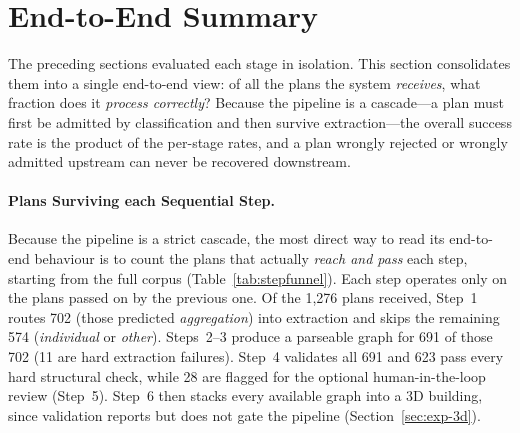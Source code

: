 \documentclass[12pt,a4paper,openright]{report}
\begin{document}
\section{End-to-End Summary}
\label{sec:exp-summary}

The preceding sections evaluated each stage in isolation. This section
consolidates them into a single end-to-end view: of all the plans the system \emph{receives}, what fraction does it \emph{process correctly}? Because the pipeline is a cascade---a plan must first be admitted by classification and then survive extraction---the overall success rate is the product of the per-stage rates, and a plan wrongly rejected or wrongly admitted upstream can never be recovered downstream.

\paragraph{Plans Surviving each Sequential Step.} Because the pipeline is a strict cascade, the most direct way to read its end-to-end behaviour is to count the plans that actually \emph{reach and pass} each step, starting from the full corpus (Table~\ref{tab:stepfunnel}). Each step operates only on the plans passed on by the previous one. Of the 1,276 plans received, Step~1 routes 702 (those predicted \textit{aggregation}) into extraction and skips the remaining 574 (\textit{individual} or \textit{other}). Steps~2--3 produce a parseable graph for 691 of those 702 (11 are hard extraction failures). Step~4 validates all 691 and 623 pass every hard structural check, while 28 are flagged for the optional
human-in-the-loop review (Step~5). Step~6 then stacks every available graph into a 3D building, since validation reports but does not gate the pipeline (Section~\ref{sec:exp-3d}).
\end{document}
